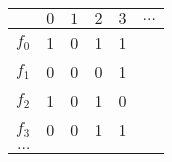 
\begin{longtable}{|r||r|r|r|r|r|}
\hline 
         & $0$ & $1$ & $2$ & $3$ & $\ldots$ \\ \hline \hline 
$f_0$    & 1   & 0   & 1   & 1   &          \\ \hline 
$f_1$    & 0   & 0   & 0   & 1   &          \\ \hline 
$f_2$    & 1   & 0   & 1   & 0   &          \\ \hline 
$f_3$    & 0   & 0   & 1   & 1   &          \\ \hline 
$\ldots$ &     &     &     &     &          \\ \hline 
\end{longtable}
        
